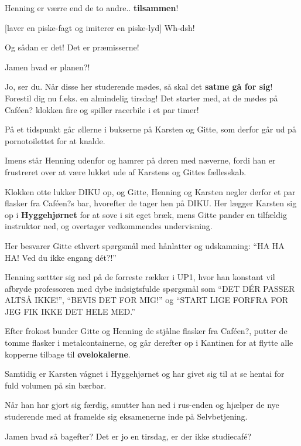 \documentclass[a4paper,11pt]{article}
\begin{document}
\begin{sketch}
 Henning er værre end de to andre.. \textbf{tilsammen}!

[laver en piske-fagt og imiterer en piske-lyd] Wh-dsh!

 Og sådan er det! Det er præmisserne!

 Jamen hvad er planen?! 


 Jo, ser du. Når disse her studerende mødes, så skal det \textbf{satme gå for sig}! Forestil dig nu f.eks. en almindelig tirsdag! Det starter med, at de mødes på Caféen? klokken fire og spiller racerbile i et par timer!

 På et tidspunkt går øllerne i bukserne på Karsten og Gitte, som derfor går ud på pornotoilettet for at knalde.

 Imens står Henning udenfor og hamrer på døren med næverne, fordi han er frustreret over at være lukket ude af Karstens og Gittes fællesskab.

 Klokken otte lukker DIKU op, og Gitte, Henning og Karsten negler derfor et par flasker fra Caféen?s bar, hvorefter de tager hen på DIKU. Her lægger Karsten sig op i \textbf{Hyggehjørnet} for at sove i sit eget bræk, mens Gitte pander en tilfældig instruktor ned, og overtager vedkommendes undervisning.

 Her besvarer Gitte ethvert spørgsmål med hånlatter og udskamning: ``HA HA HA!  Ved du ikke engang dét?!''

 Henning sættter sig ned på de forreste rækker i UP1, hvor han konstant vil afbryde professoren med dybe indsigtsfulde spørgsmål som ``DET DÉR PASSER ALTSÅ IKKE!'', ``BEVIS DET FOR MIG!'' og ``START LIGE FORFRA FOR JEG FIK IKKE DET HELE MED.''

 Efter frokost bunder Gitte og Henning de stjålne flasker fra Caféen?, putter de tomme flasker i metalcontainerne, og går derefter op i Kantinen for at flytte alle kopperne tilbage til \textbf{øvelokalerne}.

 Samtidig er Karsten vågnet i Hyggehjørnet og har givet sig til at se hentai for fuld volumen på sin bærbar.

 Når han har gjort sig færdig, smutter han ned i rus-enden og hjælper de nye studerende med at framelde sig eksamenerne inde på Selvbetjening.

 Jamen hvad så bagefter? Det er jo en tirsdag, er der ikke studiecafé?


\end{sketch}
\end{document}
